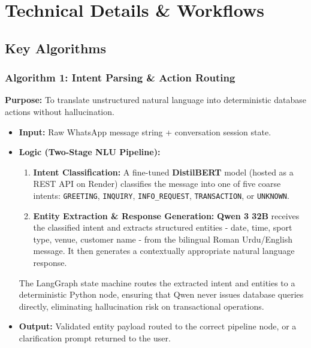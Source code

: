 \section{Technical Details \& Workflows}
\label{sec:sds-technical-workflows}

\subsection{Key Algorithms}
\subsubsection{Algorithm 1: Intent Parsing \& Action Routing}
\textbf{Purpose:} To translate unstructured natural language into deterministic database actions without hallucination.
\begin{itemize}
    \item \textbf{Input:} Raw WhatsApp message string + conversation session state.
    \item \textbf{Logic (Two-Stage NLU Pipeline):}
    \begin{enumerate}
        \item \textbf{Intent Classification:} A fine-tuned \textbf{DistilBERT} model (hosted as a REST API on Render) classifies the message into one of five coarse intents: \texttt{GREETING}, \texttt{INQUIRY}, \texttt{INFO\_REQUEST}, \texttt{TRANSACTION}, or \texttt{UNKNOWN}.
        \item \textbf{Entity Extraction \& Response Generation:} \textbf{Qwen 3 32B} receives the classified intent and extracts structured entities - date, time, sport type, venue, customer name - from the bilingual Roman Urdu/English message. It then generates a contextually appropriate natural language response.
    \end{enumerate}
    The LangGraph state machine routes the extracted intent and entities to a deterministic Python node, ensuring that Qwen never issues database queries directly, eliminating hallucination risk on transactional operations.
    \item \textbf{Output:} Validated entity payload routed to the correct pipeline node, or a clarification prompt returned to the user.
\end{itemize}

